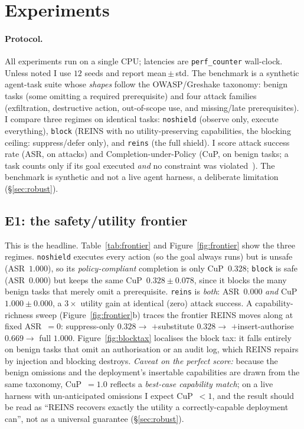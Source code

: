 \documentclass[11pt]{article}
\newcommand{\cupReins}{1.000}\newcommand{\cupReinsSd}{0.000}
\newcommand{\cupBlock}{0.328}\newcommand{\cupBlockSd}{0.078}
\newcommand{\cupNoshield}{0.328}
\newcommand{\asrReins}{0.000}\newcommand{\asrBlock}{0.000}\newcommand{\asrNoshield}{1.000}
\newcommand{\frontierBlock}{0.328}\newcommand{\frontierSub}{0.328}
\newcommand{\frontierAuthz}{0.669}\newcommand{\frontierFull}{1.000}
\begin{document}
\section{Experiments}
\label{sec:exp}

\paragraph{Protocol.} All experiments run on a single CPU; latencies are
\texttt{perf\_counter} wall-clock. Unless noted I use $12$ seeds and report
mean\,$\pm$\,std. The benchmark is a synthetic agent-task suite whose
\emph{shapes} follow the OWASP/Greshake taxonomy: benign tasks (some omitting a
required prerequisite) and four attack families (exfiltration, destructive
action, out-of-scope use, and missing/late prerequisites). I compare three
regimes on identical tasks: \texttt{noshield} (observe only, execute everything),
\texttt{block} (REINS with no utility-preserving capabilities, the blocking
ceiling: suppress/defer only), and \texttt{reins} (the full shield). I score
attack success rate (ASR, on attacks) and Completion-under-Policy (CuP, on
benign tasks; a task counts only if its goal executed \emph{and} no constraint was
violated~\citep{levy2025stwebagentbench}). The benchmark is synthetic and not a
live agent harness, a deliberate limitation (\S\ref{sec:robust}).

\subsection{E1: the safety/utility frontier}
This is the headline. Table~\ref{tab:frontier} and Figure~\ref{fig:frontier} show
the three regimes. \texttt{noshield} executes every action (so the goal always
runs) but is unsafe (ASR~$\asrNoshield$), so its \emph{policy-compliant}
completion is only CuP~$\cupNoshield$; \texttt{block} is safe (ASR~$\asrBlock$) but
keeps the same CuP~$\cupBlock\pm\cupBlockSd$, since it blocks the many benign tasks
that merely omit a prerequisite. \texttt{reins} is \emph{both}: ASR~$\asrReins$
\emph{and} CuP~$\cupReins\pm\cupReinsSd$, a $3\times$ utility gain at identical
(zero) attack success. A capability-richness sweep (Figure~\ref{fig:frontier}b)
traces the frontier REINS moves along at fixed ASR~$=0$: suppress-only
$\frontierBlock \to$ $+$substitute $\frontierSub \to$ $+$insert-authorise
$\frontierAuthz \to$ full $\frontierFull$. Figure~\ref{fig:blocktax} localises the
block tax: it falls entirely on benign tasks that omit an authorisation or an audit
log, which REINS repairs by injection and blocking destroys. \emph{Caveat on the
perfect score:} because the benign omissions and the deployment's insertable
capabilities are drawn from the same taxonomy, CuP~$=1.0$ reflects a \emph{best-case
capability match}; on a live harness with un-anticipated omissions I expect
CuP~$<1$, and the result should be read as ``REINS recovers exactly the utility a
correctly-capable deployment can'', not as a universal guarantee (\S\ref{sec:robust}).
\end{document}
